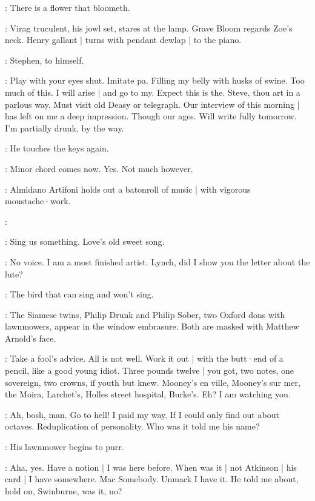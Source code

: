 \Henry:
There is a flower that bloometh.%

:
Virag truculent,
his jowl set,
stares at the lamp.
Grave Bloom regards Zoe's neck.
Henry gallant |
turns with pendant dewlap |
to the piano.

:
Stephen,
to himself.

\Stephen:
Play with your eyes shut.
Imitate pa.
Filling my belly with husks of swine.
Too much of this.
I will arise |
and go to my.
Expect this is the.
Steve,
thou art in a parlous way.
Must visit old Deasy or telegraph.
Our interview of this morning |
has left on me a deep impression.
Though our ages.
Will write fully tomorrow.
I'm partially drunk,
by the way.

:
He touches the keys again.

\Stephen:
Minor chord comes now.
Yes.
Not much however.

:
Almidano Artifoni holds out a batonroll of music |
with vigorous moustache·work.

\Artifoni:

\Florry[1]:
Sing us something.
Love's old sweet song.

\Stephen:
No voice.
I am a most finished artist.
Lynch,
did I show you the letter about the lute?

\Florry:
The bird that can sing and won't sing.

:
The Siamese twins,
Philip Drunk and Philip Sober,
two Oxford dons with lawnmowers,
appear in the window embrasure.
Both are masked with Matthew Arnold's face.

\PhilipSober[2]:
Take a fool's advice.
All is not well.
Work it out |
with the butt·end of a pencil,
like a good young idiot.
Three pounds twelve |
you got,
two notes,
one sovereign,
two crowns,
if youth but knew.
Mooney's en ville,
Mooney's sur mer,
the Moira,
Larchet's,
Holles street hospital,
Burke's.
Eh?
I am watching you.%

\PhilipDrunk[2]:
Ah,
bosh,
man.
Go to hell!
I paid my way.
If I could only find out about octaves.
Reduplication of personality.
Who was it told me his name?

:
His lawnmower begins to purr.

\PhilipDrunk:
Aha,
yes.
Have a notion |
I was here before.
When was it |
not Atkinson |
his card |
I have somewhere.
Mac Somebody.
Unmack I have it.
He told me about,
hold on,
Swinburne,
was it,
no?

